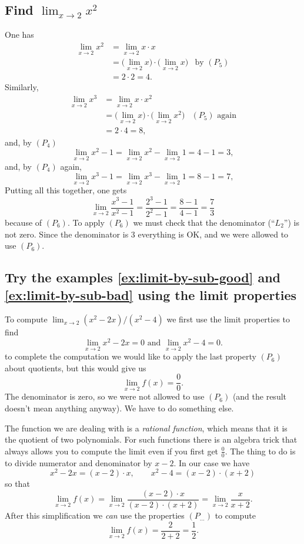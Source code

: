 \subsection{Find $\lim_{x\to2}x^2$}
One has
\begin{align*}
  \lim_{x\to2} x^2 &= \lim_{x\to2} x\cdot x \\
  &= \bigl( \lim_{x\to2} x\bigr)\cdot \bigl( \lim_{x\to2} x\bigr)
  &\text{by $(P_5)$}\\
  &= 2\cdot 2 = 4.
\end{align*}
Similarly,
\begin{align*}
  \lim_{x\to2} x^3 &= \lim_{x\to2} x\cdot x^2 \\
  &= \bigl( \lim_{x\to2} x\bigr)\cdot \bigl( \lim_{x\to2} x^2\bigr)
  &\text{$(P_5)$ again}\\
  &= 2\cdot 4 = 8,
\end{align*}
and, by $(P_4)$
\[
\lim_{x\to2} x^2-1 = \lim_{x\to2} x^2 - \lim_{x\to2} 1 = 4-1 = 3,
\]
and, by $(P_4)$ again,
\[
\lim_{x\to2} x^3-1 = \lim_{x\to2} x^3 - \lim_{x\to2} 1 = 8-1 = 7,
\]
Putting all this together, one gets
\[
\lim_{x\to 2}\frac{x^3-1}{x^2-1} = \frac{2^3-1}{2^2-1} = \frac{8-1}{4-1}=
\frac{7}{3}
\]
because of $(P_6)$.  To apply $(P_6)$ we must check that the denominator
(``$L_2$'') is not zero.  Since the denominator is 3 everything is OK, and
we were allowed to use $(P_6)$.


\subsection{Try the examples \ref{ex:limit-by-sub-good} and \ref{ex:limit-by-sub-bad} using the limit properties}
To compute $\lim_{x\to 2}(x^2-2x)/(x^2-4)$ we first use the limit
properties to find
\[
\lim_{x\to2} x^2-2x = 0 \text{ and }\lim_{x\to 2}x^2 - 4 = 0.
\]
to complete the computation we would like to apply the last property
$(P_6)$ about quotients, but this would give us
\[
\lim_{x\to2} f(x) = \frac 00.
\]
The denominator is zero, so we were not allowed to use $(P_6)$ (and the
result doesn't mean anything anyway).  We have to do something else.

The function we are dealing with is a \emph{rational function}, which means
that it is the quotient of two polynomials.  For such functions there is an
algebra trick that always allows you to compute the limit even if you
first get $\frac 00$.  The thing to do is to divide numerator and
denominator by $x-2$.  In our case we have
\[
x^2-2x = (x-2)\cdot x, \qquad x^2-4 = (x-2)\cdot (x+2)
\]
so that
\[
\lim_{x\to2} f(x) =\lim_{x\to2} \frac{(x-2)\cdot x } {(x-2)\cdot (x+2)} =
\lim_{x\to2} \frac{x}{x+2}.
\]
After this simplification we \emph{can} use the properties $(P_{\ldots})$
to compute
\[
\lim_{x\to2} f(x) = \frac{2}{2+2} = \frac12.
\]

